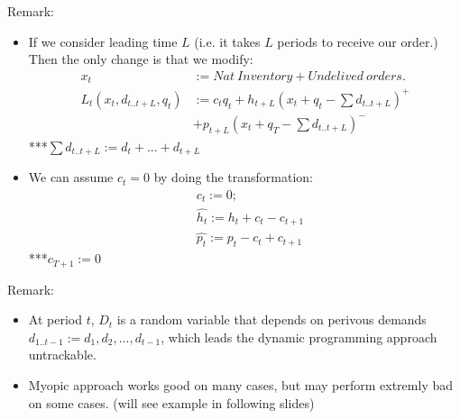 \documentclass{beamer}
\begin{document}
\begin{frame}
Remark: 
    \begin{itemize}
      \item 
        If we consider leading time $L$ (i.e. it takes $L$ periods to receive our order.) Then the only change is that we modify:
        \begin{eqnarray*}
          x_t & := Nat~Inventory + Undelived~orders.\\
          L_t(x_t,d_{t..t+L},q_t)& :=c_tq_t + h_{t+L}(x_t + q_t - \sum d_{t..t+L})^{+} \\ &  + p_{t+L}(x_t + q_T - \sum d_{t..t+L})^{-}
        \end{eqnarray*}
        ***$ \sum d_{t..t+L} := d_t + ... + d_{t+L}$
      \item
        We can assume $c_t = 0$ by doing the transformation:
        \begin{eqnarray*}
          &\hat{c_t} := 0;\\
          &\hat{h_t} := h_t + c_t - c_{t+1}\\
          &\hat{p_t} := p_t - c_t + c_{t+1}
        \end{eqnarray*}
        ***$c_{T+1} := 0$
      \end{itemize}
\end{frame}

\begin{frame}
Remark: 
    \begin{itemize}
      \item 
        At period $t$, $D_t$ is a random variable that depends on perivous demands $d_{1..t-1} := {d_1,d_2,...,d_{t-1}}$, which leads the dynamic programming approach untrackable.
      \item
        Myopic approach works good on many cases, but may perform extremly bad on some cases. (will see example in following slides)
    \end{itemize}
\end{frame}
\end{document}
